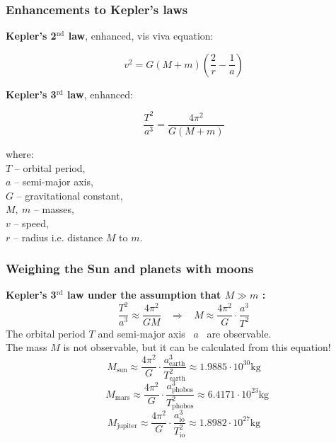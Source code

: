 \documentclass[aspectratio=169,xcolor=pdftex,dvipsnames]{beamer} %
\begin{document}
\begin{frame}
\frametitle{Enhancements to Kepler's laws}

\textbf{Kepler's 2$^{\text{nd}}$ law}, enhanced, vis viva equation:

$$v^2 = G(M+m) \left(\frac{2}{r} - \frac{1}{a}\right)$$

\textbf{Kepler's 3$^{\text{rd}}$ law}, enhanced:

$$ \frac{T^2}{a^3} = \frac{4\pi^2}{G(M+m)}$$

where:\\
$T$ -- orbital period,\\
$a$ -- semi-major axis,\\
$G$ -- gravitational constant,\\
$M,\ m$ -- masses,\\
$v$ -- speed,\\
$r$ -- radius i.e. distance $M$ to $m$.

\end{frame}

\begin{frame}
\frametitle{Weighing the Sun and planets with moons}

\textbf{Kepler's 3$^{\text{rd}}$ law under the assumption that $M \gg m$ : }
$$ \frac{T^2}{a^3} \approx \frac{4\pi^2}{GM} \ \ \ \ \Rightarrow \ \ \ \  M\approx\frac{4\pi^2}{G}\cdot \frac{a^3}{T^2}$$
\noindent
The orbital period $T$ and semi-major axis \ $a$  \ are observable.\\
The mass $M$ is not observable, but it can be calculated from this equation!
$$ M_\text{sun}\approx\frac{4\pi^2}{G}\cdot \frac{a_\text{earth}^3}{T_\text{earth}^2} \approx 1.9885\cdot 10^{30} \text{kg} $$
$$\  \  \ M_\text{mars}\approx\frac{4\pi^2}{G}\cdot \frac{a_\text{phobos}^3}{T_\text{phobos}^2} \approx 6.4171\cdot 10^{23} \text{kg} $$
$$ M_\text{jupiter}\approx\frac{4\pi^2}{G}\cdot \frac{a_\text{io}^3}{T_\text{io}^2} \approx 1.8982 \cdot 10^{27} \text{kg} $$
\end{frame}
\end{document}

